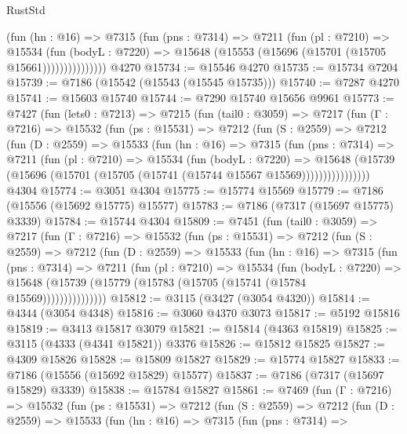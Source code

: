 \begin{lexlean}{RustStd}
\begin{coremodule}
{\begin{coremodule}
{{{{{{{{{{{{{{{{{{{{{{{{{{{{{{{{                  (fun (hn : @16) =>
                  @7315
                    (fun (pns : @7314) =>
                    @7211
                      (fun (pl : @7210) =>
                      @15534
                        (fun (bodyL : @7220) =>
                        @15648 (@15553 (@15696 (@15701 (@15705 @15661)))))))))))))))
    @4270
@15734 := @15546 @4270
@15735 := @15734 @7204
@15739 := @7186 (@15542 (@15543 (@15545 @15735)))
@15740 := @7287 @4270
@15741 := @15603 @15740
@15744 := @7290 @15740 @15656 @9961
@15773 := @7427
    (fun (lets0 : @7213) =>
    @7215
      (fun (tail0 : @3059) =>
      @7217
        (fun (Γ : @7216) =>
        @15532
          (fun (ps : @15531) =>
          @7212
            (fun (S : @2559) =>
            @7212
              (fun (D : @2559) =>
              @15533
                (fun (hn : @16) =>
                @7315
                  (fun (pns : @7314) =>
                  @7211
                    (fun (pl : @7210) =>
                    @15534
                      (fun (bodyL : @7220) =>
                      @15648
                        (@15739
                          (@15696 (@15701 (@15705 (@15741 (@15744 @15567 @15569))))))))))))))))
    @4304
@15774 := @3051 @4304
@15775 := @15774 @15569
@15779 := @7186 (@15556 (@15692 @15775) @15577)
@15783 := @7186 (@7317 (@15697 @15775) @3339)
@15784 := @15744 @4304
@15809 := @7451
    (fun (tail0 : @3059) =>
    @7217
      (fun (Γ : @7216) =>
      @15532
        (fun (ps : @15531) =>
        @7212
          (fun (S : @2559) =>
          @7212
            (fun (D : @2559) =>
            @15533
              (fun (hn : @16) =>
              @7315
                (fun (pns : @7314) =>
                @7211
                  (fun (pl : @7210) =>
                  @15534
                    (fun (bodyL : @7220) =>
                    @15648 (@15739 (@15779 (@15783 (@15705 (@15741 (@15784 @15569)))))))))))))))
@15812 := @3115 (@3427 (@3054 @4320))
@15814 := @4344 (@3054 @4348)
@15816 := @3060 @4370 @3073
@15817 := @5192 @15816
@15819 := @3413 @15817 @3079
@15821 := @15814 (@4363 @15819)
@15825 := @3115 (@4333 (@4341 @15821)) @3376
@15826 := @15812 @15825
@15827 := @4309 @15826
@15828 := @15809 @15827
@15829 := @15774 @15827
@15833 := @7186 (@15556 (@15692 @15829) @15577)
@15837 := @7186 (@7317 (@15697 @15829) @3339)
@15838 := @15784 @15827
@15861 := @7469
    (fun (Γ : @7216) =>
    @15532
      (fun (ps : @15531) =>
      @7212
        (fun (S : @2559) =>
        @7212
          (fun (D : @2559) =>
          @15533
            (fun (hn : @16) =>
            @7315
              (fun (pns : @7314) =>
}}}}}}}}}}}}}}}}}}}}}}}}}}}}}}}}
\end{coremodule}}
\end{coremodule}
\end{lexlean}
